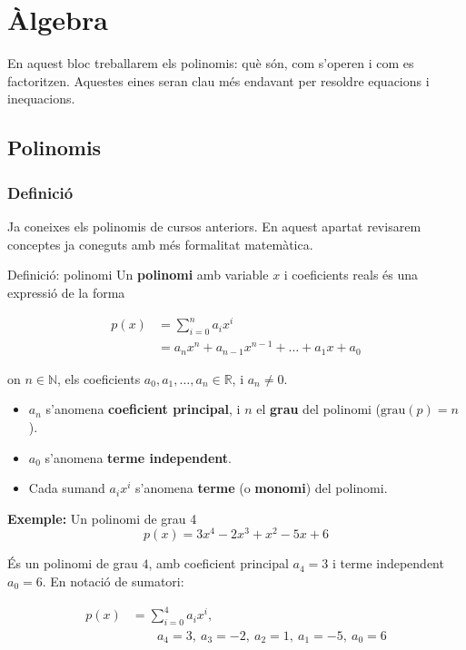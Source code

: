 
\chapter{Àlgebra}

En aquest bloc treballarem els polinomis: què són, com s'operen i com es factoritzen. Aquestes eines seran clau més endavant per resoldre equacions i inequacions.

\section{Polinomis}

\subsection{Definició}

Ja coneixes els polinomis de cursos anteriors. En aquest apartat revisarem conceptes ja coneguts amb més formalitat matemàtica.

\begin{definicio}{Definició: polinomi}
Un \textbf{polinomi} amb variable $x$ i coeficients reals és una expressió de la forma

\[
\begin{aligned}
p(x) &= \sum_{i=0}^{n} a_i x^i \\
&= a_n x^n + a_{n-1}x^{n-1} + \dots + a_1 x + a_0
\end{aligned}
\]

on $n\in\mathbb{N}$, els coeficients $a_0,a_1,\dots,a_n \in \mathbb{R}$, i $a_n \neq 0$.

\begin{itemize}
\item $a_n$ s'anomena \textbf{coeficient principal}, i $n$ el \textbf{grau} del polinomi ($\text{grau}(p)=n$).
\item $a_0$ s'anomena \textbf{terme independent}.
\item Cada sumand $a_i x^i$ s'anomena \textbf{terme} (o \textbf{monomi}) del polinomi.
\end{itemize}
\end{definicio}

\begin{exemple}{\textbf{Exemple:} Un polinomi de grau 4}
\[
p(x) = 3x^4 - 2x^3 + x^2 - 5x + 6
\]

És un polinomi de grau $4$, amb coeficient principal $a_4=3$ i terme independent $a_0=6$. En notació de sumatori:

\[
\begin{aligned}
p(x) &= \sum_{i=0}^{4} a_i x^i, \\
&\qquad a_4=3,\ a_3=-2,\ a_2=1,\ a_1=-5,\ a_0=6
\end{aligned}
\]
\end{exemple}

